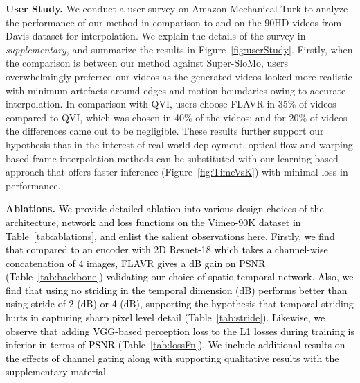 \documentclass[10pt,twocolumn,letterpaper]{article}
\newcommand{\figref}[1]{Figure~\ref{#1}}
\newcommand{\tabref}[1]{Table~\ref{#1}}
\newcommand{\red}[1]{{#1}}
\newcommand{\Ours}{FLAVR}
\newcommand{\eightx}{}
\newcommand{\new}[1]{\textcolor{black}{#1}}
\begin{document}
\begin{table*}[!t]
\begin{figure*}[t]
\begin{center}
    \end{center}
    \vspace{-16pt}
    \captionsetup{width=\textwidth, font=footnotesize}
    \caption{{\bf Video object segmentation mask propagation on DAVIS}. \Ours{} helps to improve video object tracking in low fps videos. \Ours{} is first used to up-sample video into higher frame rate, then a standard object segment propagation, e.g., CRW~\cite{jabri2020space}, is applied on interpolated videos. Refer \tabref{tab:tracking} for quantitative improvements.}
    \label{fig:downstream}
    \vspace{-16pt}
\end{figure*} 



{\bf User Study.} 
We conduct a user survey on Amazon Mechanical Turk to analyze the performance of our method in comparison to \cite{xu2019quadratic} and \cite{jiang2018super} on the 90HD videos from Davis dataset for \eightx{} interpolation. 
We explain the details of the survey in \emph{supplementary}, and summarize the results in \figref{fig:userStudy}.
Firstly, when the comparison is between our method against Super-SloMo, users overwhelmingly preferred our videos as the generated videos looked more realistic with minimum artefacts around edges and motion boundaries owing to accurate interpolation. In comparison with QVI, users choose \Ours{} in 35\% of videos compared to QVI, which was chosen in 40\% of the videos; and for 20\% of videos the differences came out to be negligible. These results further support our hypothesis that in the interest of real world deployment, optical flow and warping based frame interpolation methods can be substituted with our learning based approach that offers faster inference (\figref{fig:TimeVsK}) with minimal loss in performance.

{\bf Ablations.} \new{  We provide detailed ablation into various design choices of the architecture, network and loss functions on the Vimeo-90K dataset in \tabref{tab:ablations}, and enlist the salient observations here. Firstly, we find that compared to an encoder with 2D Resnet-18 which takes a channel-wise concatenation of 4 images, \Ours{} gives a dB gain on PSNR (\tabref{tab:backbone}) validating our choice of spatio temporal network. Also, we find that using no striding in the temporal dimension (dB) performs better than using stride of 2 (dB) or 4 (dB), supporting the hypothesis that temporal striding hurts in capturing sharp pixel level detail (\tabref{tab:stride}). Likewise, we observe that adding VGG-based perception loss \cite{johnson2016perceptual} to the L1 losses during training is inferior in terms of PSNR (\tabref{tab:lossFn}). We include additional results on the effects of channel gating along with supporting qualitative results with the \red{supplementary material}.
}


\end{table*}
\end{document}
